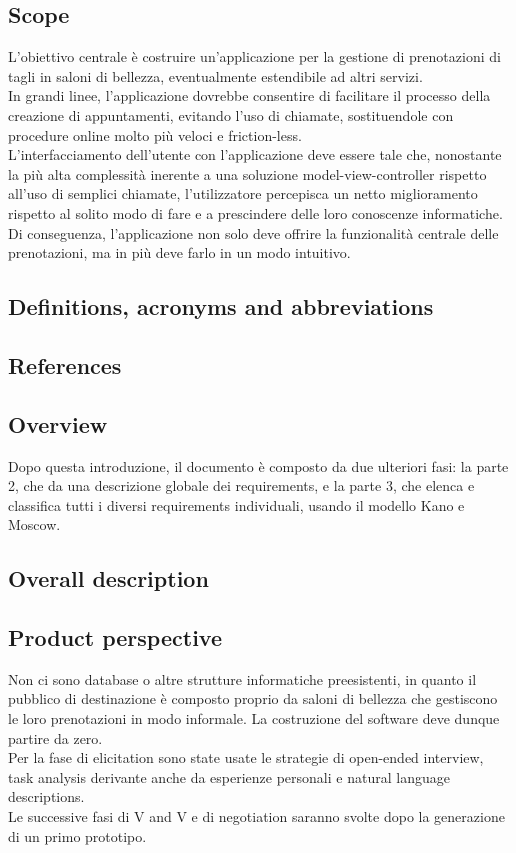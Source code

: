 \documentclass{article}
\begin{document}
\subsection{Scope}
L’obiettivo centrale è costruire un’applicazione per la gestione di prenotazioni di tagli in saloni di bellezza, eventualmente estendibile ad altri servizi. 
\\In grandi linee, l’applicazione dovrebbe consentire di facilitare il processo della creazione di appuntamenti, evitando l’uso di chiamate, sostituendole con procedure online molto più veloci e friction-less. 
\\L’interfacciamento dell’utente con l’applicazione deve essere tale che, nonostante la più alta complessità inerente a una soluzione model-view-controller rispetto all’uso di semplici chiamate, l’utilizzatore percepisca un netto miglioramento rispetto al solito modo di fare e a prescindere delle loro conoscenze informatiche. 
\\Di conseguenza, l’applicazione non solo deve offrire la funzionalità centrale delle prenotazioni, ma in più deve farlo in un modo intuitivo. 

\subsection {Definitions, acronyms and abbreviations }
\subsection {References} 
\subsection {Overview} 
Dopo questa introduzione, il documento è composto da due ulteriori fasi: la parte 2, che da una descrizione globale dei requirements, e la parte 3, che elenca e classifica tutti i diversi requirements individuali, usando il modello Kano e Moscow.
\subsection {Overall description} 
\subsection {Product perspective} 
Non ci sono database o altre strutture informatiche preesistenti, in quanto il pubblico di destinazione è composto proprio da saloni di bellezza che gestiscono le loro prenotazioni in modo informale. La costruzione del software deve dunque partire da zero.
\\ Per la fase di elicitation sono state usate le strategie di open-ended interview, task analysis derivante anche da esperienze personali e natural language descriptions. 
\\ Le successive fasi di V and V e di negotiation saranno svolte dopo la generazione di un primo prototipo.
\end{document}
